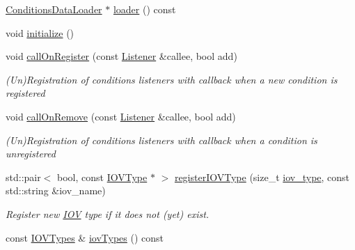 \begin{DoxyCompactItemize}
\hyperlink{class_d_d4hep_1_1_conditions_1_1_conditions_data_loader}{ConditionsDataLoader} $\ast$ \hyperlink{class_d_d4hep_1_1_conditions_1_1_conditions_manager_object_ad0e321f7b3bd3abf8a6ccac213c022b8}{loader} () const 
\item 
void \hyperlink{class_d_d4hep_1_1_conditions_1_1_conditions_manager_object_a598756c7672c67065f3d116689f95722}{initialize} ()
\item 
void \hyperlink{class_d_d4hep_1_1_conditions_1_1_conditions_manager_object_a74aa106c194fb9ca929c8cf523632ce3}{callOnRegister} (const \hyperlink{class_d_d4hep_1_1_conditions_1_1_conditions_manager_object_ac4cd1e3a448bc1f8bae384d194f10c23}{Listener} \&callee, bool add)
\begin{DoxyCompactList}\small\item\em (Un)Registration of conditions listeners with callback when a new condition is registered \item\end{DoxyCompactList}\item 
void \hyperlink{class_d_d4hep_1_1_conditions_1_1_conditions_manager_object_a4a8912db5a30d6792455aef57c223bed}{callOnRemove} (const \hyperlink{class_d_d4hep_1_1_conditions_1_1_conditions_manager_object_ac4cd1e3a448bc1f8bae384d194f10c23}{Listener} \&callee, bool add)
\begin{DoxyCompactList}\small\item\em (Un)Registration of conditions listeners with callback when a condition is unregistered \item\end{DoxyCompactList}\item 
std::pair$<$ bool, const \hyperlink{class_d_d4hep_1_1_i_o_v_type}{IOVType} $\ast$ $>$ \hyperlink{class_d_d4hep_1_1_conditions_1_1_conditions_manager_object_ace52e06206ed940af14fd32db36d5d08}{registerIOVType} (size\_\-t \hyperlink{class_d_d4hep_1_1_i_o_v}{iov\_\-type}, const std::string \&iov\_\-name)
\begin{DoxyCompactList}\small\item\em Register new \hyperlink{class_d_d4hep_1_1_i_o_v}{IOV} type if it does not (yet) exist. \item\end{DoxyCompactList}\item 
const \hyperlink{class_d_d4hep_1_1_conditions_1_1_conditions_manager_object_a8c3b7d5bdfb7fc6bf6e61ddba5a5f652}{IOVTypes} \& \hyperlink{class_d_d4hep_1_1_conditions_1_1_conditions_manager_object_ab19f2ded7e79ae78aa18dbbb52bc0bba}{iovTypes} () const 

\end{DoxyCompactItemize}
